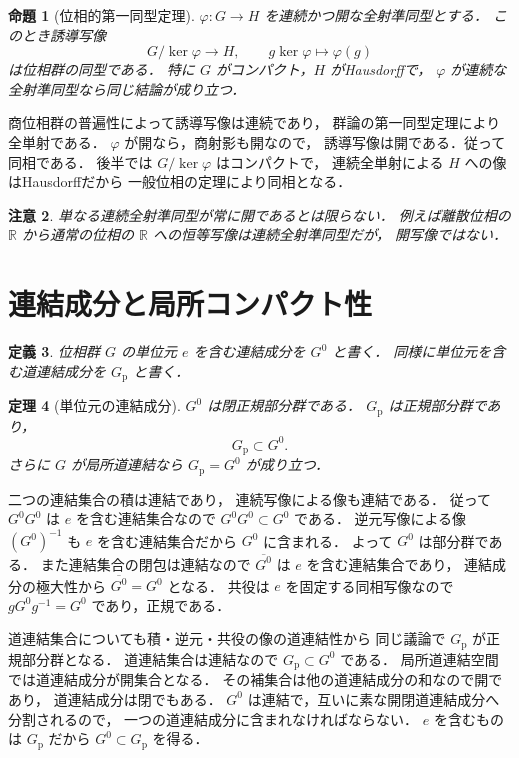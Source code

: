 \documentclass[a5paper,10pt,onecolumn]{jsarticle}
\makeatletter
\theoremstyle{mathnotetheorem}
\newtheorem{theorem}{定理}[section]
\newtheorem{definition}[theorem]{定義}
\newtheorem{proposition}[theorem]{命題}
\newtheorem{remark}[theorem]{注意}
\renewcommand{\proofname}{証明}
\renewenvironment{proof}[1][\proofname]{%
  \par\pushQED{\qed}\normalfont\topsep4\p@\@plus2\p@\relax
  \trivlist\item[\hskip\labelsep\bfseries #1]\ignorespaces
}{\popQED\endtrivlist\@endpefalse}
\makeatother
\begin{document}
\begin{proposition}[位相的第一同型定理]\label{prop:first-isomorphism}
$\varphi:G\to H$ を連続かつ開な全射準同型とする．
このとき誘導写像
\[
 G/\ker\varphi\longrightarrow H,\qquad
 g\ker\varphi\longmapsto\varphi(g)
\]
は位相群の同型である．
特に $G$ がコンパクト，$H$ がHausdorffで，
$\varphi$ が連続な全射準同型なら同じ結論が成り立つ．
\end{proposition}
\begin{proof}
商位相群の普遍性によって誘導写像は連続であり，
群論の第一同型定理により全単射である．
$\varphi$ が開なら，商射影も開なので，
誘導写像は開である．従って同相である．
後半では $G/\ker\varphi$ はコンパクトで，
連続全単射による $H$ への像はHausdorffだから
一般位相の定理により同相となる．
\end{proof}

\begin{remark}
単なる連続全射準同型が常に開であるとは限らない．
例えば離散位相の $\mathbb R$ から通常の位相の
$\mathbb R$ への恒等写像は連続全射準同型だが，
開写像ではない．
\end{remark}

\section{連結成分と局所コンパクト性}

\begin{definition}
位相群 $G$ の単位元 $e$ を含む連結成分を $G^0$ と書く．
同様に単位元を含む道連結成分を $G_{\mathrm p}$ と書く．
\end{definition}

\begin{theorem}[単位元の連結成分]\label{thm:identity-component}
$G^0$ は閉正規部分群である．
$G_{\mathrm p}$ は正規部分群であり，
\[
 G_{\mathrm p}\subset G^0.
\]
さらに $G$ が局所道連結なら
$G_{\mathrm p}=G^0$ が成り立つ．
\end{theorem}
\begin{proof}
二つの連結集合の積は連結であり，
連続写像による像も連結である．
従って $G^0G^0$ は $e$ を含む連結集合なので
$G^0G^0\subset G^0$ である．
逆元写像による像 $(G^0)^{-1}$ も
$e$ を含む連結集合だから $G^0$ に含まれる．
よって $G^0$ は部分群である．
また連結集合の閉包は連結なので
$\overline{G^0}$ は $e$ を含む連結集合であり，
連結成分の極大性から $\overline{G^0}=G^0$ となる．
共役は $e$ を固定する同相写像なので
$gG^0g^{-1}=G^0$ であり，正規である．

道連結集合についても積・逆元・共役の像の道連結性から
同じ議論で $G_{\mathrm p}$ が正規部分群となる．
道連結集合は連結なので $G_{\mathrm p}\subset G^0$ である．
局所道連結空間では道連結成分が開集合となる．
その補集合は他の道連結成分の和なので開であり，
道連結成分は閉でもある．
$G^0$ は連結で，互いに素な開閉道連結成分へ分割されるので，
一つの道連結成分に含まれなければならない．
$e$ を含むものは $G_{\mathrm p}$ だから
$G^0\subset G_{\mathrm p}$ を得る．
\end{proof}
\end{document}
